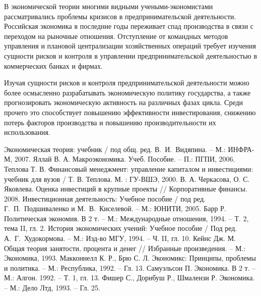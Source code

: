 В экономической теории многими видными учеными-экономистами рассматривались
проблемы кризисов в предпринимательской деятельности. Российская экономика в
последние годы переживает спад производства в связи с переходом на рыночные
отношения. Отступление от командных методов управления и плановой централизации
хозяйственных операций требует изучения сущности рисков и контроля в управлении
предпринимательской деятельностью в коммерческих банках и фирмах.

Изучая сущности рисков и контроля предпринимательской деятельности можно более
осмысленно разрабатывать экономическую политику государства, а также
прогнозировать экономическую активность на различных фазах цикла. Среди прочего
это способствует повышению эффективности инвестирования, снижению потерь
факторов производства и повышению производительности их использования.

\newpage %
\renewcommand{\bibname}{Список литературы}

\begin{thebibliography}{99} 
     Экономическая теория: учебник / под общ. ред. В.~И.~Видяпина.
    -- М.: ИНФРА-М, 2007.
     Яллай В. А. Макроэкономика. Учеб. Пособие. -- П.: ПГПИ, 2006.
     Теплова Т. В. Финансовый менеджмент: управление капиталом и
    инвестициями: учебник для вузов / Т. В. Теплова. М. : ГУ-ВШЭ, 2000.
     В. А. Черкасова, О. С. Яковлева. Оценка инвестиций в крупные
    проекты // Корпоративные финансы. 2008.
     Инвестиционная деятельность: Учебное пособие / под ред.
    Г.~П.~Подшиваленко и М.~В.~Киселевой. -- М.: ЮНИТИ, 2005. 
     Барр Р. Политическая экономия. В 2 т. -- М.: Международные
    отношения, 1994. -- Т. 2, тема II, гл. 2.
     История экономических учений: Учебное пособие / Под ред.
    А.~Г.~Худокормова. -- М.: Изд-во МГУ, 1994. -- Ч. II, гл. 10.
     Кейнс Дж. М. Общая теория занятости, процента и денег
    // Избранные произведения. -- М.: Экономика, 1993.
     Макконнелл К. Р., Брю С. Л. Экономикс: Принципы, проблемы и
    политика. -- М.: Республика, 1992. -- Гл. 13.
     Самуэльсон П. Экономика. В 2 т. -- М.: Алгон. 1992. -- Т. 1,
    гл. 13. 
     Фишер С., Дорнбуш Р., Шмалензи Р. Экономика. -- М.: Дело Лтд,
    1993. -- Гл. 25.
\end{thebibliography}